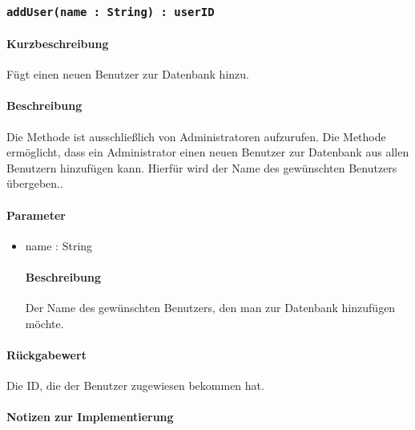 \subsubsection{\texttt{addUser(name : String) : userID}}%
\paragraph*{Kurzbeschreibung}
Fügt einen neuen Benutzer zur Datenbank hinzu.
\paragraph*{Beschreibung}
Die Methode ist ausschließlich von Administratoren aufzurufen.
Die Methode ermöglicht, dass ein Administrator einen neuen Benutzer zur Datenbank aus allen Benutzern hinzufügen kann.
Hierfür wird der Name des gewünschten Benutzers übergeben..
\paragraph*{Parameter}
\begin{itemize}
    \item name : String
    		\paragraph*{Beschreibung}
    		Der Name des gewünschten Benutzers, den man zur Datenbank hinzufügen möchte.
\end{itemize}
\paragraph*{Rückgabewert}
Die ID, die der Benutzer zugewiesen bekommen hat.

\paragraph*{Notizen zur Implementierung}%
